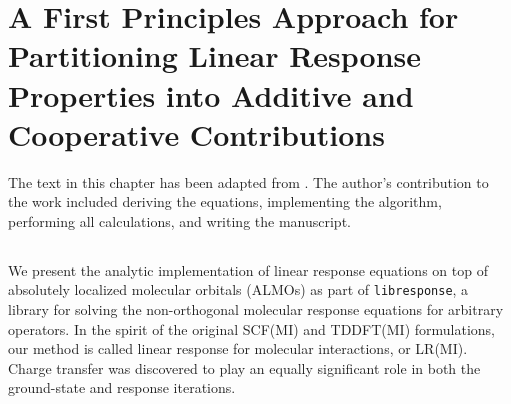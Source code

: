 \chapter[ALMO Linear Response]{A First Principles Approach for Partitioning Linear Response Properties into Additive and Cooperative Contributions}
\label{ch:paper_04}

The text in this chapter has been adapted from . The author's contribution to the work included deriving the equations, implementing the algorithm, performing all calculations, and writing the manuscript.

\newcommand{\arlidimer}{\ce{Ar\bond{....}Li+}}

\newcommand{\aud}{\si{\bohr\cubed}}
\newcommand{\geomdeftsvp}{\SI{2.4106}{\angstrom}}
\newcommand{\geomdeftsvpd}{\SI{2.4297}{\angstrom}}

\newcommand{\pdalton}{\textsc{Dalton}}
\newcommand{\libresponse}{\texttt{libresponse}}
\newcommand{\psif}{\textsc{Psi4}}
\newcommand{\qchem}{\textsc{Q-Chem}}
\newcommand{\response}{\textsc{Response}}
\newcommand{\op}[1]{\ensuremath{\hat{#1}}}
\newcommand{\mat}[1]{\ensuremath{\mathbf{#1}}}
\newcommand{\Order}[1]{\ensuremath{\mathcal{O}\left(#1\right)}}
\newcommand{\tr}[1]{\ensuremath{{\mathrm{Tr}}\left\{#1\right\}}}
\newcommand{\eq}[1]{eq.~(\ref{#1})}
\newcommand{\citen}[1]{ref.~\parencite{#1}}
\newcommand{\lr}[2]{\braket{\braket{\op{#1}; \op{#2}}}}
\newcommand{\lrs}[4]{\braket{\braket{\op{#1}_{#2}; \op{#3}_{#4}}}}

\section{\texorpdfstring{}{Summary}}

We present the analytic implementation of linear response equations on top of absolutely localized molecular orbitals (ALMOs) as part of \libresponse{}, a library for solving the non-orthogonal molecular response equations for arbitrary operators. In the spirit of the original SCF(MI) and TDDFT(MI) formulations, our method is called linear response for molecular interactions, or LR(MI). Charge transfer was discovered to play an equally significant role in both the ground-state and response iterations.

\section{\texorpdfstring{}{Introduction}}
\label{sec:introduction}

